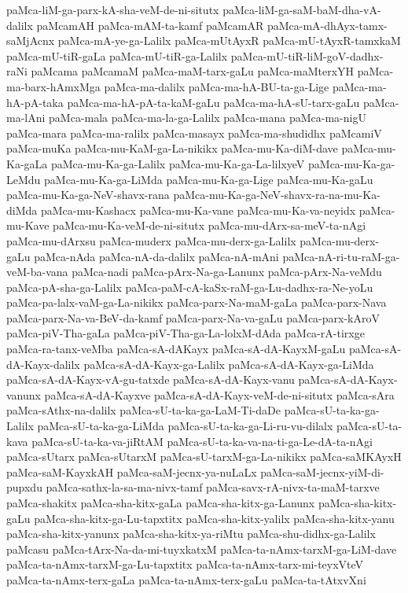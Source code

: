 {paMca-liM-ga-parx-kA-sha-veM-de-ni-situtx
paMca-liM-ga-saM-baM-dha-vA-dalilx
paMcamAH
paMca-mAM-ta-kamf
paMcamAR
paMca-mA-dhAyx-tamx-saMjAcnx
paMca-mA-ye-ga-Lalilx
paMca-mUtAyxR
paMca-mU-tAyxR-tamxkaM
paMca-mU-tiR-gaLa
paMca-mU-tiR-ga-Lalilx
paMca-mU-tiR-liM-goV-dadhx-raNi
paMcama
paMcamaM
paMca-maM-tarx-gaLu
paMca-maMterxYH
paMca-ma-barx-hAmxMga
paMca-ma-dalilx
paMca-ma-hA-BU-ta-ga-Lige
paMca-ma-hA-pA-taka
paMca-ma-hA-pA-ta-kaM-gaLu
paMca-ma-hA-sU-tarx-gaLu
paMca-ma-lAni
paMca-mala
paMca-ma-la-ga-Lalilx
paMca-mana
paMca-ma-nigU
paMca-mara
paMca-ma-ralilx
paMca-masayx
paMca-ma-shudidhx
paMcamiV
paMca-muKa
paMca-mu-KaM-ga-La-nikikx
paMca-mu-Ka-diM-dave
paMca-mu-Ka-gaLa
paMca-mu-Ka-ga-Lalilx
paMca-mu-Ka-ga-La-lilxyeV
paMca-mu-Ka-ga-LeMdu
paMca-mu-Ka-ga-LiMda
paMca-mu-Ka-ga-Lige
paMca-mu-Ka-gaLu
paMca-mu-Ka-ga-NeV-shavx-rana
paMca-mu-Ka-ga-NeV-shavx-ra-na-mu-Ka-diMda
paMca-mu-Kashacx
paMca-mu-Ka-vane
paMca-mu-Ka-va-neyidx
paMca-mu-Kave
paMca-mu-Ka-veM-de-ni-situtx
paMca-mu-dArx-sa-meV-ta-nAgi
paMca-mu-dArxsu
paMca-muderx
paMca-mu-derx-ga-Lalilx
paMca-mu-derx-gaLu
paMca-nAda
paMca-nA-da-dalilx
paMca-nA-mAni
paMca-nA-ri-tu-raM-ga-veM-ba-vana
paMca-nadi
paMca-pArx-Na-ga-Lanunx
paMca-pArx-Na-veMdu
paMca-pA-sha-ga-Lalilx
paMca-paM-cA-kaSx-raM-ga-Lu-dadhx-ra-Ne-yoLu
paMca-pa-lalx-vaM-ga-La-nikikx
paMca-parx-Na-maM-gaLa
paMca-parx-Nava
paMca-parx-Na-va-BeV-da-kamf
paMca-parx-Na-va-gaLu
paMca-parx-kAroV
paMca-piV-Tha-gaLa
paMca-piV-Tha-ga-La-lolxM-dAda
paMca-rA-tirxge
paMca-ra-tanx-veMba
paMca-sA-dAKayx
paMca-sA-dA-KayxM-gaLu
paMca-sA-dA-Kayx-dalilx
paMca-sA-dA-Kayx-ga-Lalilx
paMca-sA-dA-Kayx-ga-LiMda
paMca-sA-dA-Kayx-vA-gu-tatxde
paMca-sA-dA-Kayx-vanu
paMca-sA-dA-Kayx-vanunx
paMca-sA-dA-Kayxve
paMca-sA-dA-Kayx-veM-de-ni-situtx
paMca-sAra
paMca-sAthx-na-dalilx
paMca-sU-ta-ka-ga-LaM-Ti-daDe
paMca-sU-ta-ka-ga-Lalilx
paMca-sU-ta-ka-ga-LiMda
paMca-sU-ta-ka-ga-Li-ru-vu-dilalx
paMca-sU-ta-kava
paMca-sU-ta-ka-va-jiRtAM
paMca-sU-ta-ka-va-na-ti-ga-Le-dA-ta-nAgi
paMca-sUtarx
paMca-sUtarxM
paMca-sU-tarxM-ga-La-nikikx
paMca-saMKAyxH
paMca-saM-KayxkAH
paMca-saM-jecnx-ya-nuLaLx
paMca-saM-jecnx-yiM-di-pupxdu
paMca-sathx-la-sa-ma-nivx-tamf
paMca-savx-rA-nivx-ta-maM-tarxve
paMca-shakitx
paMca-sha-kitx-gaLa
paMca-sha-kitx-ga-Lanunx
paMca-sha-kitx-gaLu
paMca-sha-kitx-ga-Lu-tapxtitx
paMca-sha-kitx-yalilx
paMca-sha-kitx-yanu
paMca-sha-kitx-yanunx
paMca-sha-kitx-ya-riMtu
paMca-shu-didhx-ga-Lalilx
paMcasu
paMca-tArx-Na-da-mi-tuyxkatxM
paMca-ta-nAmx-tarxM-ga-LiM-dave
paMca-ta-nAmx-tarxM-ga-Lu-tapxtitx
paMca-ta-nAmx-tarx-mi-teyxVteV
paMca-ta-nAmx-terx-gaLa
paMca-ta-nAmx-terx-gaLu
paMca-ta-tAtxvXni
}
